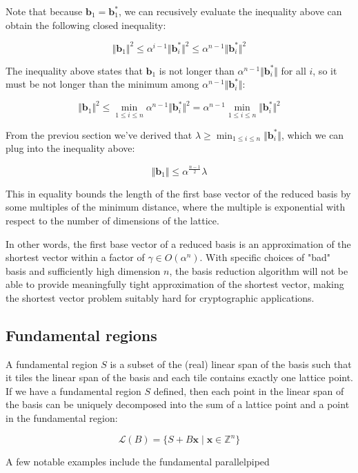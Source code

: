 Note that because $\mathbf{b}_1 = \mathbf{b}_1^\ast$, we can recusively evaluate the inequality above can obtain the following closed inequality:

$$
\Vert \mathbf{b}_1 \Vert^2 \leq \alpha^{i-1} \Vert \mathbf{b}_{i}^\ast \Vert^2 \leq \alpha^{n-1} \Vert \mathbf{b}_{i}^\ast \Vert^2
$$

The inequality above states that $\mathbf{b}_1$ is not longer than $\alpha^{n-1} \Vert \mathbf{b}_{i}^\ast \Vert$ for all $i$, so it must be not longer than the minimum among $\alpha^{n-1} \Vert \mathbf{b}_{i}^\ast \Vert$:

$$
\Vert \mathbf{b}_1 \Vert^2 \leq \min_{1 \leq i \leq n}\alpha^{n-1} \Vert \mathbf{b}_{i}^\ast \Vert^2 = \alpha^{n-1} \min_{1 \leq i \leq n}\Vert \mathbf{b}_{i}^\ast \Vert^2
$$

From the previou section we've derived that $\lambda \geq \min_{1 \leq i \leq n} \Vert \mathbf{b}_i^\ast \Vert$, which we can plug into the inequality above:

$$
\Vert \mathbf{b}_1 \Vert \leq \alpha^\frac{n-1}{2} \lambda
$$

This in equality bounds the length of the first base vector of the reduced basis by some multiples of the minimum distance, where the multiple is exponential with respect to the number of dimensions of the lattice.

In other words, the first base vector of a reduced basis is an approximation of the shortest vector within a factor of $\gamma \in O(\alpha^n)$. With specific choices of "bad" basis and sufficiently high dimension $n$, the basis reduction algorithm will not be able to provide meaningfully tight approximation of the shortest vector, making the shortest vector problem suitably hard for cryptographic applications.


\subsection{Fundamental regions}
A fundamental region $S$ is a subset of the (real) linear span of the basis such that it tiles the linear span of the basis and each tile contains exactly one lattice point. If we have a fundamental region $S$ defined, then each point in the linear span of the basis can be uniquely decomposed into the sum of a lattice point and a point in the fundamental region:

$$
\mathcal{L}(B) = \{S + B\mathbf{x} \mid \mathbf{x} \in \mathbb{Z}^n\}
$$

A few notable examples include the fundamental parallelpiped 

